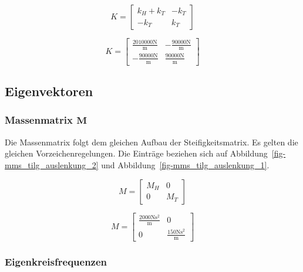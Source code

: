 \documentclass[
  letterpaper,
  DIV=11]{scrreprt}
\begin{document}
\begin{equation}K = \left[\begin{matrix}k_{H} + k_{T} & - k_{T}\\- k_{T} & k_{T}\end{matrix}\right]\end{equation}

\begin{equation}K = \left[\begin{matrix}\frac{2010000 \text{N}}{\text{m}} & - \frac{90000 \text{N}}{\text{m}}\\- \frac{90000 \text{N}}{\text{m}} & \frac{90000 \text{N}}{\text{m}}\end{matrix}\right]\end{equation}

\hypertarget{eigenvektoren-2}{%
\subsection{Eigenvektoren}\label{eigenvektoren-2}}

\hypertarget{massenmatrix-mathbfm-2}{%
\subsubsection{\texorpdfstring{Massenmatrix
\(\mathbf{M}\)}{Massenmatrix \textbackslash mathbf\{M\}}}\label{massenmatrix-mathbfm-2}}

Die Massenmatrix folgt dem gleichen Aufbau der Steifigkeitsmatrix. Es
gelten die gleichen Vorzeichenregelungen. Die Einträge beziehen sich auf
Abbildung~\ref{fig-mms_tilg_auslenkung_2} und
Abbildung~\ref{fig-mms_tilg_auslenkung_1}.

\begin{equation}M = \left[\begin{matrix}M_{H} & 0\\0 & M_{T}\end{matrix}\right]\end{equation}

\begin{equation}M = \left[\begin{matrix}\frac{2000 \text{N} \text{s}^{2}}{\text{m}} & 0\\0 & \frac{150 \text{N} \text{s}^{2}}{\text{m}}\end{matrix}\right]\end{equation}

\hypertarget{eigenkreisfrequenzen-3}{%
\subsubsection{Eigenkreisfrequenzen}\label{eigenkreisfrequenzen-3}}
\end{document}
